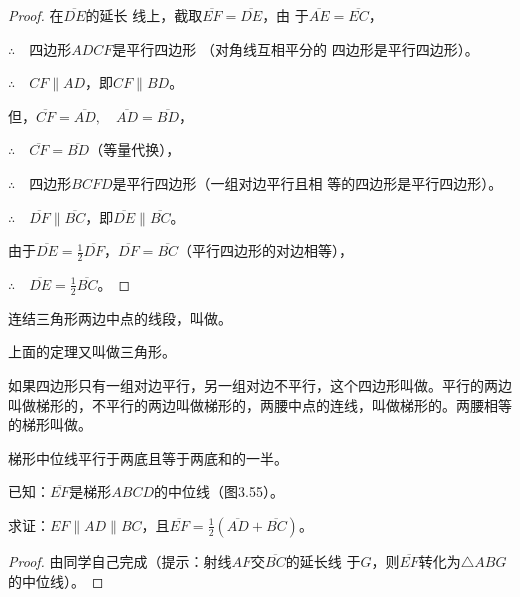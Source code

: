 \begin{proof}
 在$\overline{DE}$的延长
线上，截取$\overline{EF}=\overline{DE}$，由
于$\overline{AE}=\overline{EC}$，

$\therefore\quad $四边形$ADCF$是平行四边形
（对角线互相平分的
四边形是平行四边形）。

$\therefore\quad CF\parallel AD$，即$CF\parallel BD$。

但，$\overline{CF}=\overline{AD},\quad \overline{AD}=\overline{BD}$，

$\therefore\quad \overline{CF}=\overline{BD}$（等量代换），

$\therefore\quad $四边形$BCFD$是平行四边形（一组对边平行且相
等的四边形是平行四边形）。

$\therefore\quad \overline{DF}\parallel \overline{BC}$，即$\overline{DE}\parallel \overline{BC}$。

由于$\overline{DE}=\frac{1}{2}\overline{DF}$，$\overline{DF}=\overline{BC}$（平行四边形的对边相等），

$\therefore\quad \overline{DE}=\frac{1}{2}\overline{BC}$。
\end{proof}

\begin{Definition}
连结三角形两边中点的线段，叫做。
\end{Definition}

上面的定理又叫做三角形。

\begin{Definition} 
如果四边形只有一组对边平行，另一组对边不平行，这个四边形叫做。平行的两边叫做梯形的，不平行的两边叫做梯形的，两腰中点的连线，叫做梯形的。两腰相等的梯形叫做。
\end{Definition}

\begin{example}
    梯形中位线平行于两底且等于两底和的一半。
\end{example}

已知：$\overline{EF}$是梯形$ABCD$的中位线（图3.55）。

求证：$EF\parallel AD\parallel BC$，且$\overline{EF}=\frac{1}{2}(\overline{AD}+\overline{BC})$。

\begin{proof}
由同学自己完成（提示：射线$AF$交$\overline{BC}$的延长线
    于$G$，则$\overline{EF}$转化为$\triangle ABG$的中位线）。
\end{proof}

